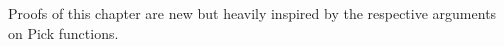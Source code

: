 Proofs of this chapter are new but heavily inspired by the respective arguments on Pick functions.

\begin{comment}

TODO:

\begin{itemize}
	\item Why smoothness
	\item Examples
	\item Pick functions are monotone
	\item Heaviside function
	\item Trace inequalities: if $f$ is monotone/convex then $\tr f$ is monotone/convex. Proof idea: we may write $\tr f$ as a limit of finite sum of translations of Heaviside functions (monotone case) or absolute values (convex case), so its sufficient to prove the claim for these functions. For monotone case it hence suffices to prove that if $A \leq B$, $B$ has at least as many non-negative eigenvalues as $A$. But this is clear by subspace characterization of non-negative eigenvalues. For convex case, it suffices to prove that $\tr |A| + \tr |B| \geq \tr |A + B|$ for any $A, B \in \H^{n}(a, b)$. For this, note that if $(e_{i})_{i = 1}^{n}$ is eigenbasis of $A + B$, we have
	\begin{eqnarray*}
		\tr |A + B| &=& \sum_{i = 1}^{n} \langle |A + B| e_{i}, e_{i} \rangle \\
		= \sum_{i = 1}^{n} \left|\langle (A + B) e_{i}, e_{i} \rangle \right| &\leq& \sum_{i = 1}^{n} \left|\langle A e_{i}, e_{i} \rangle \right| + \sum_{i = 1}^{n} \left|\langle B e_{i}, e_{i} \rangle \right| \\
		\leq \sum_{i = 1}^{n} \langle |A| e_{i}, e_{i} \rangle + \sum_{i = 1}^{n} \langle |B| e_{i}, e_{i} \rangle &=& \tr |A| + \tr |B|
	\end{eqnarray*}
	\item What about trace inequalities for $k$-tone functions? Eigen-package seems to find a counterexample for $6$-tone functions and $n = 2$, but it's hard to see if there's enough numerical stability. At divided differences of polynomials vanish. First non-trivial question would be:
	If $A_{j} = A + j H$ for $0 \leq j \leq 3$ and $H \geq 0$. Then is it necessarily the case that
	\begin{align*}
		\tr \left(A_{3} |A_{3}| - 3 A_{2}|A_{2}| + 3 A_{1} |A_{1}| - A_{0} |A_{0}| \right) \geq 0?
	\end{align*}
	This would imply that $3$-tone functions would lift to trace $3$-tone functions. Maybe expressing this as a contour integral from $-i \infty \to i \infty$ a same tricks as in the paper. First projection case: $H$ is projection. Or: approximate by integrals of heat kernels. It should be sufficient to proof things for $k$-fold integrals or heat kernel, or by scaling just for gaussian function.

\end{comment}
